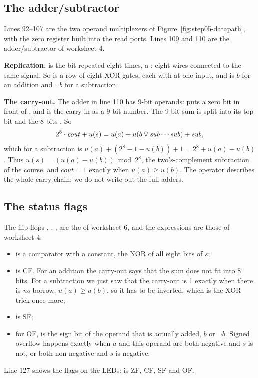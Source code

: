 {{{{\subsection*{The adder/subtractor}


Lines 92--107 are the two operand multiplexers of
Figure~\ref{fig:step05-datapath}, with the zero register built into the read
ports. Lines 109 and 110 are the adder/subtractor of worksheet 4.

\textbf{Replication.}  is the bit  repeated eight
times, a : eight wires connected to the same signal. So
 is a row of eight XOR gates, each with  at one
input, and  is $b$ for an addition and $\neg b$ for a subtraction.

\textbf{The carry-out.} The adder in line 110 has 9-bit operands:  puts a zero bit in front of , and  is the carry-in
as a 9-bit number. The 9-bit sum is split into its top bit  and the
8 bits . So
\[
  2^8 \cdot \mathit{cout} + u(s) = u(a) + u(b \mathbin{\dot{\lor}} \mathit{sub}\cdots\mathit{sub})
  + \mathit{sub},
\]
which for a subtraction is $u(a) + (2^8 - 1 - u(b)) + 1 = 2^8 + u(a) - u(b)$.
Thus $u(s) = (u(a) - u(b)) \bmod 2^8$, the two's-complement subtraction of the
course, and $\mathit{cout} = 1$ exactly when $u(a) \ge u(b)$. The \cc{+}
operator describes the whole carry chain; we do not write out the full adders.

\subsection*{The status flags}


The flip-flops , , ,  are the
 of worksheet 6, and the expressions are those of
worksheet 4:
\begin{itemize}
\item {} is a comparator with a constant, the NOR of all eight
  bits of $s$;
\item {} is CF. For an addition the carry-out says that the sum
  does not fit into 8 bits. For a subtraction we just saw that the carry-out
  is 1 exactly when there is \emph{no} borrow, $u(a) \ge u(b)$, so it has to be
  inverted, which is the XOR trick once more;
\item {} is SF;
\item for OF,  is the sign bit of the operand that is actually
  added, $b$ or $\neg b$. Signed overflow happens exactly when $a$ and this
  operand are both negative and $s$ is not, or both non-negative and $s$ is
  negative.
\end{itemize}
Line 127 shows the flags on the LEDs:  is ZF,  CF,
 SF and  OF.

}}}}
